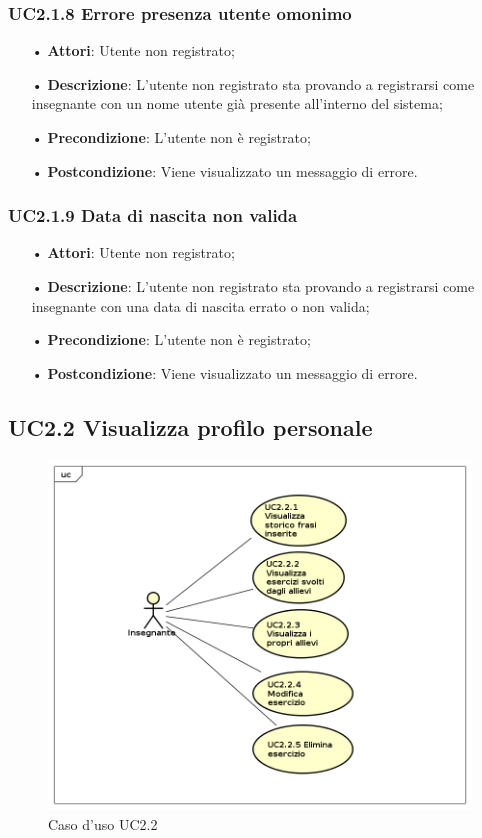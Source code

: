 \subsubsection{UC2.1.8 Errore presenza utente omonimo}
\begin{itemize}
	\item[•] \textbf{Attori}: Utente non registrato;
	\item[•] \textbf{Descrizione}:  L'utente non registrato sta provando a registrarsi come insegnante con un nome utente già presente all'interno del sistema;
	\item[•] \textbf{Precondizione}: L’utente non è registrato;
	\item[•] \textbf{Postcondizione}: Viene visualizzato un messaggio di errore.
\end{itemize}

\subsubsection{UC2.1.9 Data di nascita non valida}
\begin{itemize}
	\item[•] \textbf{Attori}: Utente non registrato;
	\item[•] \textbf{Descrizione}: L'utente non registrato sta provando a registrarsi come insegnante con una data di nascita errato o non valida;
	\item[•] \textbf{Precondizione}: L’utente non è registrato;
	\item[•] \textbf{Postcondizione}: Viene visualizzato un messaggio di errore.
\end{itemize}


\subsection{UC2.2 Visualizza profilo personale}

\begin{figure}[H]
\centering
\includegraphics[width=14cm]{img/UC22.png} 
\caption{Caso d'uso UC2.2}
\end{figure}

